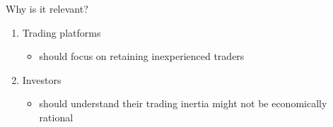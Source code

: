 \documentclass{beamer}
\begin{document}
\begin{frame}{Why is it relevant?}

	\begin{enumerate}
		\item{Trading platforms}
		\begin{itemize}
			\item should focus on retaining inexperienced traders
		\end{itemize}

		\item{Investors}
		\begin{itemize}
			\item should understand their trading inertia might not be economically rational
		\end{itemize}
	\end{enumerate}


\end{frame}
\end{document}

